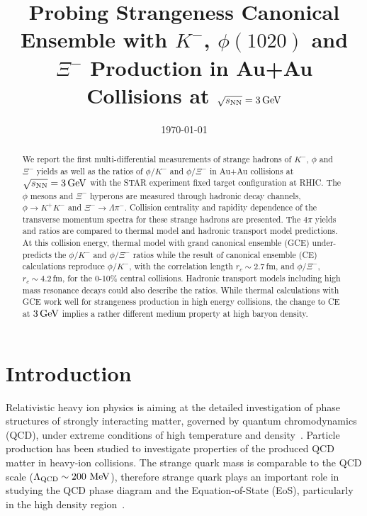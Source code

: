 \documentclass[aps,tightenlines,superscriptaddress,twocolumn]{revtex4-1}
\begin{document}
\title{Probing Strangeness Canonical Ensemble with $K^{-}$, $\phi(1020)$ and $\Xi^{-}$ Production in Au+Au Collisions at ${\sqrt{s_{\rm NN}} = \rm{3\,GeV}}$}%


%

\linenumbers

\date{\today}

\begin{abstract}
We report the first multi-differential measurements of strange hadrons of $K^{-}$, $\phi$ and $\Xi^{-}$ yields as well as the ratios of $\phi/K^-$ and $\phi/\Xi^-$ in Au+Au collisions at ${\sqrt{s_{\rm NN}} = \rm{3\,GeV}}$ with the STAR experiment fixed target configuration at RHIC. The $\phi$ mesons and $\Xi^{-}$ hyperons are measured through hadronic decay channels, $\phi\rightarrow K^+K^-$ and $\Xi^-\rightarrow \Lambda\pi^-$. 
Collision centrality and rapidity dependence of the transverse momentum spectra for these strange hadrons are presented. The $4\pi$ yields and ratios are compared to thermal model and hadronic transport model predictions.
At this collision energy, thermal model with grand canonical ensemble (GCE) under-predicts the $\phi/K^-$ and $\phi/\Xi^-$ ratios while the result of canonical ensemble (CE) calculations reproduce $\phi/K^-$, with the correlation length $r_c \sim 2.7$\,fm, and $\phi/\Xi^-$, $r_c \sim 4.2$\,fm, for the 0-10\% central collisions. Hadronic transport models including high mass resonance decays could also describe the ratios.
While thermal calculations with GCE work well for strangeness production in high energy collisions, the change to CE at $\rm{3\,GeV}$ implies a rather different medium property at high baryon density. 
\end{abstract}

\maketitle

\linenumbers

\section{Introduction}
\label{introduction}

Relativistic heavy ion physics is aiming at the detailed investigation of phase structures of strongly interacting matter, governed by quantum chromodynamics (QCD), under extreme conditions of high temperature and density~\cite{StarWhitePaper_2005,akiba2015hot,Busza_ARNPS:2018}. Particle production has been studied to investigate properties of the produced QCD matter in heavy-ion collisions. The strange quark mass is comparable to the QCD scale ($\Lambda_{\rm{QCD}}$\,$\sim\textup{200 MeV}$), therefore strange quark plays an important role in studying the QCD phase diagram and the Equation-of-State (EoS), particularly in the high density region~\cite{Rafelski:1982pu,Koch:1986ud,KO.PhysRevLett.55.2661:1985,FUCHS20061_kaons:2006,KO_sQM2017,Ks0_Lambda_HADES:2019}. 
\end{document}
